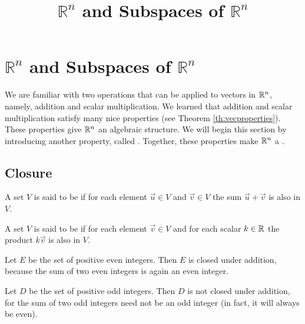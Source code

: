 \documentclass{ximera}
\title{$\mathbb{R}^n$ and Subspaces of $\mathbb{R}^n$} \license{CC BY-NC-SA 4.0}
\begin{document}
\begin{abstract}
\end{abstract}

\maketitle
\section*{$\mathbb{R}^n$ and Subspaces of $\mathbb{R}^n$}


We are familiar with two operations that can be applied to vectors in $\mathbb{R}^n$, namely, addition and scalar multiplication. We learned that addition and scalar multiplication satisfy many nice properties (see Theorem \ref{th:vecproperties}). These properties give $\mathbb{R}^n$ an algebraic structure.  We will begin this section by introducing another property, called .  Together, these properties make $\mathbb{R}^n$ a .  

\subsection*{Closure}
 \begin{definition} \label{def:closedunderaddition}
  A set $V$ is said to be  if for each element $\vec{u} \in V$ and $\vec{v} \in V$ the sum $\vec{u}+\vec{v}$ is also in $V$.
\end{definition}

  \begin{definition} \label{def:closedunderscalarmult}
  A set $V$ is said to be  if for each element $\vec{v} \in V$  and for each scalar $k \in \mathbb{R}$ the product $k\vec{v}$ is also in $V$.
\end{definition}


\begin{example}\label{ex:posevenint}
Let $E$ be the set of positive even integers.  Then $E$ is closed under addition, because the sum of two even integers is again an even integer.
\end{example}

\begin{example}\label{ex:posoddint}
Let $D$ be the set of positive odd integers.  Then $D$ is not closed under addition, for the sum of two odd integers need not be an odd integer (in fact, it will always be even).
\end{example}
\end{document}
